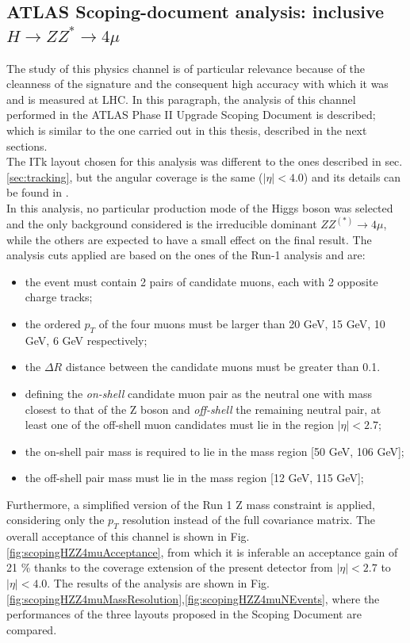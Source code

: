 \documentclass[a4paper,twoside,12pt]{article}
\begin{document}
\subsection{ATLAS Scoping-document analysis: inclusive $H \rightarrow ZZ^* \rightarrow 4\mu$}\label{subsec:physics:scoping}
The study of this physics channel is of particular relevance because of the cleanness of the signature and the consequent high accuracy with which it was and is measured at LHC. In this paragraph, the analysis of this channel performed in the ATLAS Phase II Upgrade
Scoping Document\cite{scoping_HZZ4mu} is described; which is similar to the one carried out in this
thesis, described in the next sections.\\

The ITk layout chosen for this analysis was different to the ones described in sec.\ref{sec:tracking}, but the angular coverage is the same ($|\eta| < 4.0$) and its details
can be found in \cite{scoping}.\\

In this analysis, no particular production mode of the Higgs boson was selected and the only background considered is the irreducible dominant $ZZ^{(*)} \rightarrow 4\mu$, while the others are
expected to have a small effect on the final result. The analysis cuts applied are based on the
ones of the Run-1 analysis and are:

\begin{itemize}
\item the event must contain 2 pairs of candidate muons, each with 2
opposite charge tracks;
\item the ordered $p_T$ of the four muons must be larger than 20 GeV, 15 GeV, 10 GeV, 6 GeV respectively;
\item the $\Delta R$ distance between the candidate muons must be greater than 0.1.
\item defining the \textit{on-shell} candidate muon pair as the neutral one with mass closest to that of the Z boson and \textit{off-shell} the remaining neutral pair,
 at least one of the off-shell muon candidates must lie in the
region $|\eta| < 2.7$;	
\item the on-shell pair mass is required to lie in the mass region [50 GeV, 106 GeV];
\item the off-shell pair mass must lie in the mass region [12 GeV, 115 GeV];
\end{itemize}

Furthermore, a simplified version of the Run 1 Z mass constraint is applied, considering only 
the $p_T$ resolution instead of the full covariance matrix. The overall acceptance of this channel is shown in Fig.\ref{fig:scopingHZZ4muAcceptance}, from which it is inferable an 
acceptance gain of 21 \% thanks to the coverage extension of the present detector from $|\eta| < 2.7$ to 
$|\eta| < 4.0$. The results of the analysis are shown in Fig.\ref{fig:scopingHZZ4muMassResolution},\ref{fig:scopingHZZ4muNEvents}, where the 
performances of the three layouts proposed in the Scoping Document are compared. \\
\end{document}
